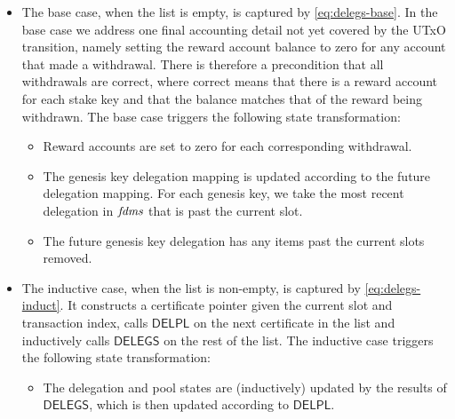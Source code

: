 \begin{itemize}
  \item The base case, when the list is empty, is captured by \cref{eq:delegs-base}.
    In the base case we address one final accounting detail not yet covered by the UTxO
    transition, namely setting the reward account balance to zero for any account that made a
    withdrawal.  There is therefore a precondition that all withdrawals are correct, where
    correct means that there is a reward account for each stake key and that the balance
    matches that of the reward being withdrawn.
    The base case triggers the following state transformation:
    \begin{itemize}
      \item Reward accounts are set to zero for each corresponding withdrawal.
      \item The genesis key delegation mapping is updated according to the future delegation
        mapping. For each genesis key, we take the most recent delegation in $\mathit{fdms}$
        that is past the current slot.
      \item The future genesis key delegation has any items past the current slots removed.
    \end{itemize}
  \item The inductive case, when the list is non-empty, is captured by \cref{eq:delegs-induct}.
    It constructs a certificate pointer given the current slot and transaction index,
    calls $\mathsf{DELPL}$ on the next certificate in the list and inductively
    calls $\mathsf{DELEGS}$ on the rest of the list.
    The inductive case triggers the following state transformation:
    \begin{itemize}
      \item The delegation and pool states are (inductively) updated by the results of
        $\mathsf{DELEGS}$, which is then updated according to $\mathsf{DELPL}$.
    \end{itemize}
\end{itemize}


